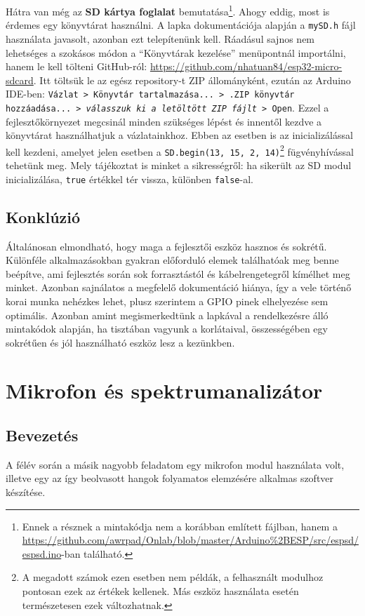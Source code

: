 \documentclass[12pt,a4paper]{article}
\begin{document}
      Hátra van még az \textbf{SD kártya foglalat} bemutatása\footnote{Ennek a résznek a mintakódja nem a korábban említett fájlban, hanem a \url{https://github.com/awrpad/Onlab/blob/master/Arduino\%2BESP/src/espsd/espsd.ino}-ban található.}. Ahogy eddig, most is érdemes egy könyvtárat használni. A lapka dokumentációja alapján a \texttt{mySD.h} fájl használata javasolt, azonban ezt telepítenünk kell. Ráadásul sajnos nem lehetséges a szokásos módon a ``Könyvtárak kezelése'' menüpontnál importálni, hanem le kell tölteni GitHub-ról: \url{https://github.com/nhatuan84/esp32-micro-sdcard}. Itt töltsük le az egész repository-t ZIP állományként, ezután az Arduino IDE-ben: \texttt{Vázlat > Könyvtár tartalmazása... > .ZIP könyvtár hozzáadása... > \textit{{válasszuk ki a letöltött ZIP fájlt}} > Open}. Ezzel a fejlesztőkörnyezet megcsinál minden szükséges lépést és innentől kezdve a könyvtárat használhatjuk a vázlatainkhoz. Ebben az esetben is az inicializálással kell kezdeni, amelyet jelen esetben a \texttt{SD.begin(13, 15, 2, 14)}\footnote{A megadott számok ezen esetben nem példák, a felhasznált modulhoz pontosan ezek az értékek kellenek. Más eszköz használata esetén természetesen ezek változhatnak.} fügvényhívással tehetünk meg. Mely tájékoztat is minket a sikrességről: ha sikerült az SD modul inicializálása, \texttt{true} értékkel tér vissza, különben \texttt{false}-al.

    \subsection{Konklúzió}
      Általánosan elmondható, hogy maga a fejlesztői eszköz hasznos és sokrétű. Különféle alkalmazásokban gyakran előforduló elemek találhatóak meg benne beépítve, ami fejlesztés során sok forrasztástól és kábelrengetegről kímélhet meg minket.
      Azonban sajnálatos a megfelelő dokumentáció hiánya, így a vele történő korai munka nehézkes lehet, plusz szerintem a GPIO pinek elhelyezése sem optimális.
      Azonban amint megismerkedtünk a lapkával a rendelkezésre álló mintakódok alapján, ha tisztában vagyunk a korlátaival, összességében egy sokrétűen és jól használható eszköz lesz a kezünkben.

  \section{Mikrofon és spektrumanalizátor}
    \subsection{Bevezetés}
      A félév során a másik nagyobb feladatom egy mikrofon modul használata volt, illetve egy az így beolvasott hangok folyamatos elemzésére alkalmas szoftver készítése.
\end{document}

